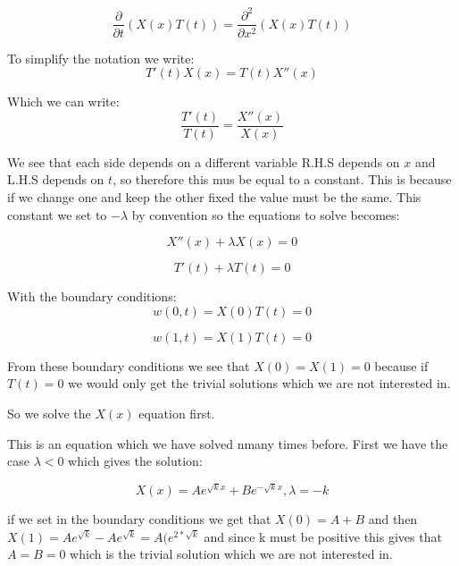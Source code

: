 \documentclass[a4paper,10pt]{article}
\begin{document}
\begin{equation}
  \frac{\partial }{\partial t}(X(x)T(t)) = \frac{\partial ^2}{\partial x^2}(X(x)T(t))
\end{equation}

To simplify the notation we write:
\begin{equation}
 T'(t)X(x) = T(t)X''(x)
\end{equation}

Which we can write:
\begin{equation}
 \frac{T'(t)}{T(t)} = \frac{X''(x)}{X(x)}
\end{equation}

We see that each side depends on a different variable R.H.S depends on $x$ and L.H.S depends on $t$, so therefore this mus be equal to a constant.
This is because if we change one and keep the other fixed the value must be the same. This constant we set to $-\lambda$ by convention so the equations
to solve becomes:

\begin{equation}
 X''(x) + \lambda X(x) = 0
\end{equation}

\begin{equation}
 T'(t) + \lambda T(t) = 0
\end{equation}

With the boundary conditions:
\begin{equation}
 w(0,t) = X(0)T(t) = 0
\end{equation}

\begin{equation}
 w(1,t) = X(1)T(t) = 0
\end{equation}

From these boundary conditions we see that $X(0) = X(1) = 0$ because if $T(t)=0$ we would only get the trivial solutions which we are not interested in.

So we solve the $X(x)$ equation first.

This is an equation which we have solved nmany times before. First we have the case $\lambda < 0$ which gives the solution:

\begin{equation}
  X(x) = Ae^{\sqrt{k}x} + Be^{-\sqrt{k}x}, \lambda=-k
\end{equation}

if we set in the boundary conditions we get that $X(0) = A+B$ and then $X(1) = Ae^{\sqrt{k}} - Ae^{\sqrt{k}} = A(e^{2*\sqrt{k}}$ and since k must
be positive this gives that $A=B=0$ which is the trivial solution which we are not interested in.
\end{document}

